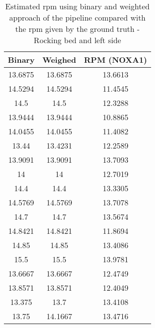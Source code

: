 \begin{table}[h]
    \centering
    \begin{tabular}{|c|c|c|}
 
    \hline 
    Binary & Weighed & RPM (NOXA1) \\ 
    \hline 
13.6875  &    13.6875   &   13.6613 \\ 
14.5294   &   14.5294    &  11.4545 \\ 
14.5     &    14.5    &  12.3288 \\ 
13.9444  &    13.9444  &    10.8865 \\ 
14.0455   &   14.0455   &   11.4082 \\ 
13.44    &  13.4231   &   12.2589 \\ 
13.9091   &   13.9091   &   13.7093 \\ 
14        &   14   &   12.7019 \\ 
14.4     &    14.4  &    13.3305 \\ 
14.5769   &   14.5769  &    13.7078 \\ 
14.7      &   14.7 &     13.5674 \\ 
14.8421   &   14.8421 &     11.8694 \\ 
14.85     &   14.85    &  13.4086 \\ 
15.5      &   15.5    &  13.9781 \\ 
13.6667  &    13.6667 &     12.4749 \\ 
13.8571   &   13.8571  &    12.4049 \\ 
13.375    &     13.7    &  13.4108 \\ 
13.75    &  14.1667      &13.4716 \\ 
\hline 
\end{tabular}
\caption{Estimated rpm using binary and weighted approach of the pipeline compared with the rpm given by the ground truth - Rocking bed and left side}
\label{tab:LeftMovsg}

\end{table}